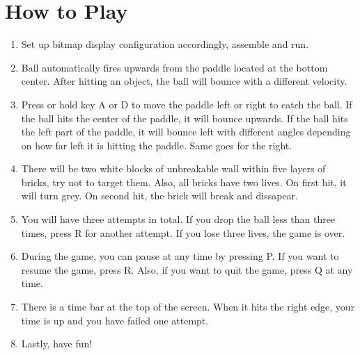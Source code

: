 \documentclass{article}
\begin{document}
\section{How to Play}
\begin{enumerate}
\item Set up bitmap display configuration accordingly, assemble and run.
\item Ball automatically fires upwards from the paddle located at the bottom center. After hitting an object, the ball will bounce with a different velocity.
\item Press or hold key A or D to move the paddle left or right to catch the ball. If the ball hits the center of the paddle, it will bounce upwards. If the ball hits the left part of the paddle, it will bounce left with different angles depending on how far left it is hitting the paddle. Same goes for the right.
\item There will be two white blocks of unbreakable wall within five layers of bricks, try not to target them. Also, all bricks have two lives. On first hit, it will turn grey. On second hit, the brick will break and dissapear.
\item You will have three attempts in total. If you drop the ball less than three times, press R for another attempt. If you lose three lives, the game is over.
\item During the game, you can pause at any time by pressing P. If you want to resume the game, press R. Also, if you want to quit the game, press Q at any time.
\item There is a time bar at the top of the screen. When it hits the right edge, your time is up and you have failed one attempt.
\item Lastly, have fun!
 
\end{enumerate}
\end{document}
